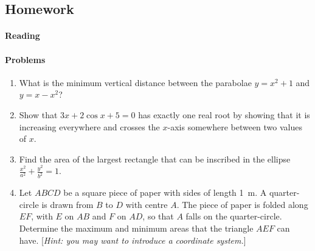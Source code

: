 \subsection{Homework}
\paragraph{Reading}


\paragraph{Problems}
\begin{enumerate}
  \item What is the minimum vertical distance between the parabolae $ y = x^2 + 1 $ and $ y = x - x^2 $?
  \item Show that $ 3x + 2\cos x + 5 = 0 $ has exactly one real root by showing that it
        is increasing everywhere and crosses the $ x$-axis somewhere between two values of $ x $.
  \item Find the area of the largest rectangle that can be inscribed in the ellipse $ \frac{x^2}{a^2} + \frac{y^2}{b^2} = 1 $.
  \item Let $ ABCD $ be a square piece of paper with sides of length \SI{1}{\metre}. A
        quarter-circle is drawn from $ B $ to $ D $ with centre $ A $. The piece of paper is folded along $ EF $, with $ E $ on $ AB $
        and $ F $ on $ AD $, so that $ A $ falls on the quarter-circle. Determine the maximum and minimum areas that the triangle $ AEF $
        can have. [\textit{Hint: you may want to introduce a coordinate system.}]
\end{enumerate}

